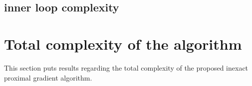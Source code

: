 \documentclass[12pt]{article}
\begin{document}
    \subsection{inner loop complexity}

\section{Total complexity of the algorithm}
    This section puts results regarding the total complexity of the proposed inexact proximal gradient algorithm. 




\end{document}

